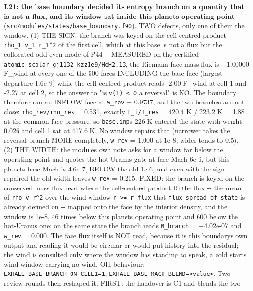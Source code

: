 \documentclass[english,a4paper]{my_memo}
\begin{document}
\begin{itemize}
  \textbf{L21: the base boundary decided its entropy branch on a quantity that is not
  a flux, and its window sat inside this planet\textquotesingle s operating point}
  (\texttt{src/modules/states/base\_boundary.f90}). TWO defects, only one of them the
  window. (1) THE SIGN: the branch was keyed on the cell-centred product
  \texttt{rho\_1\ v\_1\ r\_1\^{}2} of the first cell, which at this base is not a flux but the
  collocated odd-even mode of P44 -\/- MEASURED on the certified
  \texttt{atomic\_scalar\_gj1132\_kzz1e9/HeH2.13}, the Riemann face mass flux is
  +1.00000 F\_wind at every one of the 500 faces INCLUDING the base face
  (largest departure 1.6e-9) while the cell-centred product reads -2.00 F\_wind
  at cell 1 and -2.27 at cell 2, so the answer to "is \texttt{v(1)\ \textless{}\ 0} a reversal" is
  NO. The boundary therefore ran an INFLOW face at \texttt{w\_rev} = 0.9737, and the
  two branches are not close: \texttt{rho\_rev/rho\_res} = 0.531, exactly
  \texttt{T\_i/T\_res} = 420.4 K / 223.2 K = 1.88 at the common face pressure, so
  \texttt{base.inp}\textquotesingle s 226 K entered the state with weight 0.026 and cell 1 sat at
  417.6 K. No window repairs that (narrower takes the reversal branch MORE
  completely, \texttt{w\_rev} = 1.000 at 1e-8; wider tends to 0.5). (2) THE WIDTH: the
  module\textquotesingle s own note asks for a window far below the operating point and quotes
  the hot-Uranus gate at face Mach 6e-6, but this planet\textquotesingle s base Mach is
  4.6e-7, BELOW the old 1e-6, and even with the sign repaired the old width
  leaves \texttt{w\_rev} = 0.215. FIXED: the branch is keyed on the conserved mass flux
  read where the cell-centred product IS the flux -\/- the mean of \texttt{rho\ v\ r\^{}2}
  over the wind window \texttt{r\ \textgreater{}=\ r\_flux} that \texttt{flux\_spread\_of\_state} is already
  defined on -\/- mapped onto the face by the interior density, and the window is
  1e-8, 46 times below this planet\textquotesingle s operating point and 600 below the
  hot-Uranus one; on the same state the branch reads \texttt{M\_branch} = +4.02e-07 and
  \texttt{w\_rev} = 0.000. The face flux itself is NOT read, because it is this
  boundary\textquotesingle s own output and reading it would be circular or would put history
  into the residual; the wind is consulted only where the window has standing
  to speak, a cold start\textquotesingle s wind window carrying no wind. Old behaviour:
  \texttt{EXHALE\_BASE\_BRANCH\_ON\_CELL1=1}, \texttt{EXHALE\_BASE\_MACH\_BLEND=\textless{}value\textgreater{}}. Two review
  rounds then reshaped it. FIRST: the handover is C1 and blends the two

\end{itemize}
\end{document}
